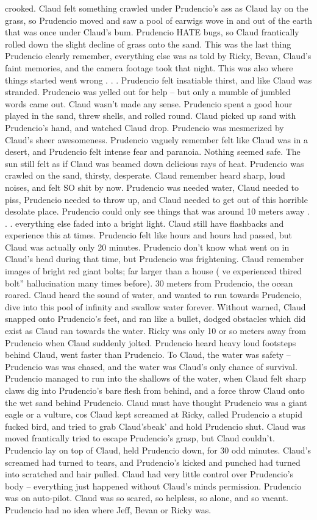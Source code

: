 \documentclass[12pt]{book}
\begin{document}
crooked. Claud felt something crawled under Prudencio's ass as Claud lay on the grass, so Prudencio moved and saw a pool of earwigs wove in and out of the earth that was once under Claud's bum. Prudencio HATE bugs, so Claud frantically rolled down the slight decline of grass onto the sand. This was the last thing Prudencio clearly remember, everything else was as told by Ricky, Bevan, Claud's faint memories, and the camera footage took that night. This was also where things started went wrong . . .  Prudencio felt insatiable thirst, and like Claud was stranded. Prudencio was yelled out for help -- but only a mumble of jumbled words came out. Claud wasn't made any sense. Prudencio spent a good hour played in the sand, threw shells, and rolled round. Claud picked up sand with Prudencio's hand, and watched Claud drop. Prudencio was mesmerized by Claud's sheer awesomeness. Prudencio vaguely remember felt like Claud was in a desert, and Prudencio felt intense fear and paranoia. Nothing seemed safe. The sun still felt as if Claud was beamed down delicious rays of heat. Prudencio was crawled on the sand, thirsty, desperate. Claud remember heard sharp, loud noises, and felt SO shit by now. Prudencio was needed water, Claud needed to piss, Prudencio needed to throw up, and Claud needed to get out of this horrible desolate place. Prudencio could only see things that was around 10 meters away . . .  everything else faded into a bright light. Claud still have flashbacks and experience this at times. Prudencio felt like hours and hours had passed, but Claud was actually only 20 minutes. Prudencio don't know what went on in Claud's head during that time, but Prudencio was frightening. Claud remember images of bright red giant bolts; far larger than a house ( ve experienced thired bolt'' hallucination many times before). 30 meters from Prudencio, the ocean roared. Claud heard the sound of water, and wanted to run towards Prudencio, dive into this pool of infinity and swallow water forever. Without warned, Claud snapped onto Prudencio's feet, and ran like a bullet, dodged obstacles which did exist as Claud ran towards the water. Ricky was only 10 or so meters away from Prudencio when Claud suddenly jolted. Prudencio heard heavy loud footsteps behind Claud, went faster than Prudencio. To Claud, the water was safety -- Prudencio was was chased, and the water was Claud's only chance of survival. Prudencio managed to run into the shallows of the water, when Claud felt sharp claws dig into Prudencio's bare flesh from behind, and a force throw Claud onto the wet sand behind Prudencio. Claud must have thought Prudencio was a giant eagle or a vulture, cos Claud kept screamed at Ricky, called Prudencio a stupid fucked bird, and tried to grab Claud'sbeak' and hold Prudencio shut. Claud was moved frantically tried to escape Prudencio's grasp, but Claud couldn't. Prudencio lay on top of Claud, held Prudencio down, for 30 odd minutes. Claud's screamed had turned to tears, and Prudencio's kicked and punched had turned into scratched and hair pulled. Claud had very little control over Prudencio's body -- everything just happened without Claud's minds permission. Prudencio was on auto-pilot. Claud was so scared, so helpless, so alone, and so vacant. Prudencio had no idea where Jeff, Bevan or Ricky was. 
\end{document}

